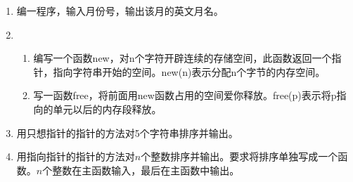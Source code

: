 \begin{enumerate}
	\item 编一程序，输入月份号，输出该月的英文月名。
	\item 
		\begin{enumerate}
			\item 编写一个函数new，对n个字符开辟连续的存储空间，此函数返回一个指针，指向字符串开始的空间。new(n)表示分配n个字节的内存空间。
			\item 写一函数free，将前面用new函数占用的空间爱你释放。free(p)表示将p指向的单元以后的内存段释放。
		\end{enumerate}
	\item 用只想指针的指针的方法对5个字符串排序并输出。
	\item 用指向指针的指针的方法对$n$个整数排序并输出。要求将排序单独写成一个函数。$n$个整数在主函数输入，最后在主函数中输出。
\end{enumerate}
